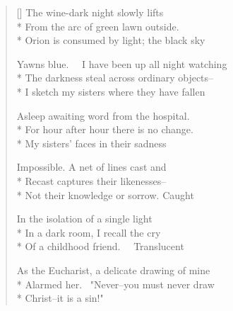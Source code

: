 \label{ch:easter}
\settowidth{\versewidth}{Yawns blue.   I have been up all night watching}
\begin{verse}[\versewidth]
The wine-dark night slowly lifts\\*
From the arc of green lawn outside.\\*
Orion is consumed by light; the black sky

Yawns blue.   I have been up all night watching\\*
The darkness steal across ordinary objects--\\*
I sketch my sisters where they have fallen

Asleep awaiting word from the hospital.\\*
For hour after hour there is no change.\\*
My sisters' faces in their sadness

Impossible. A net of lines cast and\\*
Recast captures their likenesses--\\*
Not their knowledge or sorrow. Caught

In the isolation of a single light\\*
In a dark room, I recall the cry\\*
Of a childhood friend.   Translucent

As the Eucharist, a delicate drawing of mine\\*
Alarmed her.  "Never--you must never draw\\*
Christ--it is a sin!"
\end{verse}

